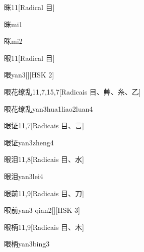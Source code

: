 \begin{entry}{眯}{11}[Radical ⽬]
  \begin{phonetics}{眯}{mi1}
  \end{phonetics}
  \begin{phonetics}{眯}{mi2}
  \end{phonetics}
\end{entry}

\begin{entry}{眼}{11}[Radical ⽬]
  \begin{phonetics}{眼}{yan3}[][HSK 2]
  \end{phonetics}
\end{entry}

\begin{entry}{眼花缭乱}{11,7,15,7}[Radicais ⽬、⾋、⽷、⼄]
  \begin{phonetics}{眼花缭乱}{yan3hua1liao2luan4}
  \end{phonetics}
\end{entry}

\begin{entry}{眼证}{11,7}[Radicais ⽬、⾔]
  \begin{phonetics}{眼证}{yan3zheng4}
  \end{phonetics}
\end{entry}

\begin{entry}{眼泪}{11,8}[Radicais ⽬、⽔]
  \begin{phonetics}{眼泪}{yan3lei4}
  \end{phonetics}
\end{entry}

\begin{entry}{眼前}{11,9}[Radicais ⽬、⼑]
  \begin{phonetics}{眼前}{yan3 qian2}[][HSK 3]
  \end{phonetics}
\end{entry}

\begin{entry}{眼柄}{11,9}[Radicais ⽬、⽊]
  \begin{phonetics}{眼柄}{yan3bing3}
  \end{phonetics}
\end{entry}

